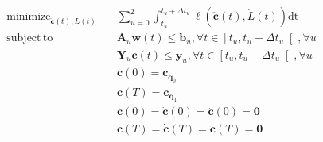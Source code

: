 \documentclass[journal]{IEEEtran}
\newcommand{\mx}[1]{\mathbf{\bm{#1}}} 				%
\newcommand{\vc}[1]{\mathbf{\bm{#1}}} 					%
\DeclareMathOperator*{\st}{subject\,to}					%
\DeclareMathOperator*{\minimize}{minimize}				%
\DeclareMathOperator*{\find}{find}						%
\newcommand{\Rv}[1]{\ensuremath{\mathbb{R}^{#1}}}				%
\begin{document}
\begin{equation} \label{eq:qp_rob} \begin{aligned}
\minimize_{\mathbf{\ddot{c}}(t), \dot{L}(t)}  \quad & \sum_{u=0}^{2} \int_{t_u}^{t_u + \Delta t_u}  \ell(\mathbf{\ddot{c}}(t), \dot{L}(t)) \text{dt}  \\
\st \quad & \mathbf{A}_u \mathbf{w}(t)  \leq \mathbf{b}_u , \forall t \in  \left[t_u, t_u + \Delta t_u \right[, \forall u \\
	\quad & \mathbf{Y}_u \mathbf{c}(t)  \leq \mathbf{y}_u , \forall t \in  \left[t_u, t_u + \Delta t_u \right[, \forall u \\
	\quad & \mathbf{c}(0)  = \mathbf{c}_{\mathbf{q}_0} \\
	\quad & \mathbf{c}(T)  = \mathbf{c}_{\mathbf{q}_1} \\
	\quad & \mathbf{c}(0)  = \mathbf{\dot{c}}(0)  = \mathbf{\ddot{c}}(0) = \mathbf{0}\\
	\quad & \mathbf{c}(T)  = \mathbf{\dot{c}}(T)  = \mathbf{\ddot{c}}(T) = \mathbf{0}\\
\end{aligned} \end{equation}
\end{document}
